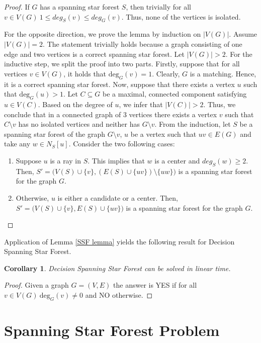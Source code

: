 \documentclass[en]{pracamgr}
\newtheorem{corollary}{Corollary}
\newcommand{\ssf}{spanning star forest}
\newcommand{\dssfp}{{\sc Decision Spanning Star Forest}}
\newcommand{\degree}[2]{\textrm{deg}_{#1}(#2)}
\begin{document}
\begin{proof}
	If $G$ has a \ssf{} $S$, then trivially for all $v \in V(G)\ 1 \leq deg_S(v) \leq deg_G(v)$. Thus, none of the vertices is isolated.
	
	For the opposite direction, we prove the lemma by induction on $|V(G)|$. Assume $|V(G)|=2$. The statement trivially holds because a graph consisting of one edge and two vertices is a correct \ssf{}. Let $|V(G)| >2$. For the inductive step, we split the proof into two parts. Firstly, suppose that for all vertices $v \in V(G)$, it holds that $\degree{G}{v}=1$.  Clearly, $G$ is a matching. Hence, it is a correct \ssf{}. Now, suppose that there exists a vertex $u$ such that $\degree{G}{u}>1$. Let $C \subseteq G$ be a maximal, connected component satisfying $u \in V(C)$. Based on the degree of $u$, we infer that $|V(C)|>2$. Thus, we conclude that in a connected graph of $3$ vertices there exists a vertex $v$ such that $C \setminus v$ has no isolated vertices and neither has $G \setminus v$. From the induction, let $S$ be a \ssf{} of the graph $G \setminus v$, $u$ be a vertex such that $uv \in E(G)$ and take any $w \in N_S[u]$. Consider the two following cases:
	\begin{enumerate}
		\item Suppose $u$ is a ray in $S$. This implies that $w$ is a center and $deg_S(w) \geq 2$. Then, $S'=\big(V(S) \cup \{v\},(E(S) \cup \{uv\}) \setminus \{uw\}\big)$ is a spanning star forest for the graph $G$.
		\item Otherwise, $u$ is either a candidate or a center. Then, $S'=\big(V(S) \cup \{v\}, E(S) \cup \{uv\}\big)$ is a spanning star forest for the graph $G$.
	\end{enumerate}
	
\end{proof}

Application of Lemma \ref{SSF lemma} yields the following result for \dssfp{}.

\begin{corollary}
	\dssfp{} can be solved in linear time.
\end{corollary}

\begin{proof}
	Given a graph $G = (V,E)$ the answer is YES if for all $v \in V(G)\ \degree{G}{v} \neq 0$ and NO otherwise.
\end{proof}

\section{Spanning Star Forest Problem}
\end{document}
